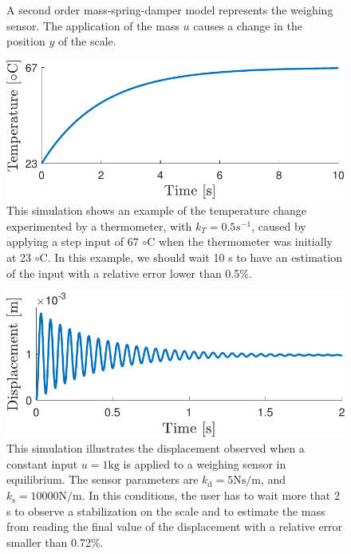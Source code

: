 \documentclass[11pt]{article}
\begin{document}
\begin{itemize}
\begin{itemize}
\begin{figure}[htb!]
\begin{tikzpicture}[every node/.style={draw,outer sep=0pt,thick}]
    \end{tikzpicture}

    \caption{\label{fig:simple_msd_system}  \color{blue} A second order mass-spring-damper model represents the weighing sensor. The application of the mass $u$ causes a change in the position $y$ of the scale. \color{black} } 
    \end{figure}


    \renewcommand{\thefigure}{2.2}
    \begin{figure}[!htbp]
    \centering
    \includegraphics[width=0.6\columnwidth]{../ChapterIntroduction/fig/Fig_2.pdf} 
    \caption{ \label{fig:thermometer} 
    \color{blue} This simulation shows an example of the temperature change experimented by a thermometer, with $k_T=0.5 s^{-1}$, caused by applying a step input of 67 $\circ \mathrm{C}$  when the thermometer was initially at 23 $\circ \mathrm{C}$. In this example, we should wait 10 s to have an estimation of the input with a relative error lower than 0.5\%. \color{black} }
    \end{figure}

    \renewcommand{\thefigure}{2.3}
    \begin{figure}[!htbp]
    \centering
    \includegraphics[width=0.6\columnwidth]{../ChapterIntroduction/fig/Fig_3.pdf} 
    \caption{ \label{fig:scale} 
    \color{blue} This simulation illustrates the displacement observed when a constant input $u=1 \mathrm{kg}$ is applied to a weighing sensor in equilibrium. The sensor parameters are $k_{\mathrm{d}} = 5 \mathrm{N s/m}$, and $k_{\mathrm{s}} = 10000 \mathrm{N/m}$. In this conditions, the user has to wait more that 2 s to observe a stabilization on the scale and to estimate the mass from reading the final value of the displacement with a relative error smaller than 0.72\%. \color{black}  }
    \end{figure}


\end{itemize}
\end{itemize}
\end{document}
